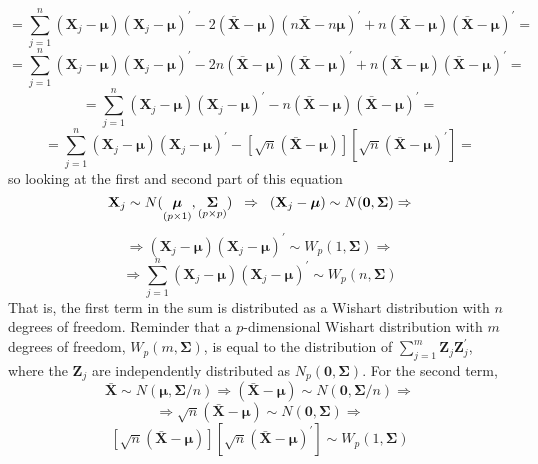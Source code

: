 \documentclass{article}
\begin{document}
    \[
        =
        \scriptstyle{
        \sum_{j=1}^{n}{
            (\textbf{X}_{j} - \bm{\mu}){(\textbf{X}_{j} - \bm{\mu})}^{\prime}
        }
        -
        2
        (\bar{\textbf{X}} - \bm{\mu})
        {(n\bar{\textbf{X}} - n\bm{\mu})}^{\prime}
        +
        n
        (\bar{\textbf{X}} - \bm{\mu}){(\bar{\textbf{X}} - \bm{\mu})}^{\prime}
        }
        =
    \]
    \[
        =
        \scriptstyle{
        \sum_{j=1}^{n}{
            (\textbf{X}_{j} - \bm{\mu}){(\textbf{X}_{j} - \bm{\mu})}^{\prime}
        }
        -
        2n
        (\bar{\textbf{X}} - \bm{\mu})
        {(\bar{\textbf{X}} - \bm{\mu})}^{\prime}
        +
        n
        (\bar{\textbf{X}} - \bm{\mu}){(\bar{\textbf{X}} - \bm{\mu})}^{\prime}
        }
        =
    \]
    \[
        =
        \sum_{j=1}^{n}{
            (\textbf{X}_{j} - \bm{\mu}){(\textbf{X}_{j} - \bm{\mu})}^{\prime}
        }
        -
        n
        (\bar{\textbf{X}} - \bm{\mu})
        {(\bar{\textbf{X}} - \bm{\mu})}^{\prime}
        =
    \]
    \[
        =
        \sum_{j=1}^{n}{
            (\textbf{X}_{j} - \bm{\mu}){(\textbf{X}_{j} - \bm{\mu})}^{\prime}
        }
        -
        \left[
            \sqrt{n}
            (\bar{\textbf{X}} - \bm{\mu})
        \right]
        \left[
            \sqrt{n}
            {(\bar{\textbf{X}} - \bm{\mu})}^{\prime}
        \right]
        =
    \]
    so looking at the first and second part of this equation
    \[
        \textbf{X}_{j}
        \sim
        N(\underset{(p \times 1)}{\bm{\mu}}, \underset{(p \times p)}{\bm{\Sigma}})
        \hspace{0.2cm}
        \Rightarrow
        \hspace{0.2cm}
        (\textbf{X}_{j} - \bm{\mu})
        \sim
        N(\textbf{0}, \bm{\Sigma})
        \Rightarrow
    \]
    \[
        \Rightarrow
        (\textbf{X}_{j} - \bm{\mu}){(\textbf{X}_{j} - \bm{\mu})}^{\prime}
        \sim
        W_{p}(1, \bm{\Sigma})
        \Rightarrow
    \]
    \[
        \Rightarrow
        \sum_{j=1}^{n}{
            (\textbf{X}_{j} - \bm{\mu}){(\textbf{X}_{j} - \bm{\mu})}^{\prime}
        }
        \sim
        W_{p}(n, \bm{\Sigma})
    \]
    That is, the first term in the sum is distributed as a Wishart distribution with $n$ degrees of freedom. Reminder that a $p$-dimensional Wishart distribution with $m$ degrees of freedom, $W_{p}(m, \bm{\Sigma})$, is equal to the distribution of $\sum_{j=1}^{m}\textbf{Z}_{j}\textbf{Z}_{j}^{\prime}$, where the $\textbf{Z}_{j}$ are independently distributed as $N_{p}(\textbf{0}, \bm{\Sigma})$. For the second term,
    \[
        \bar{\textbf{X}}
        \sim
        N(\bm{\mu}, \bm{\Sigma}/n)
        \Rightarrow
        (\bar{\textbf{X}} - \bm{\mu})
        \sim
        N(\textbf{0}, \bm{\Sigma}/n)
        \Rightarrow
    \]
    \[
        \Rightarrow
        \sqrt{n}
        (\bar{\textbf{X}} - \bm{\mu})
        \sim
        N(\textbf{0}, \bm{\Sigma})
        \Rightarrow
    \]
    \[
        \left[
            \sqrt{n}
            (\bar{\textbf{X}} - \bm{\mu})
        \right]
        \left[
            \sqrt{n}
            {(\bar{\textbf{X}} - \bm{\mu})}^{\prime}
        \right]
        \sim
        W_{p}(1, \bm{\Sigma})
    \]
\end{document}
